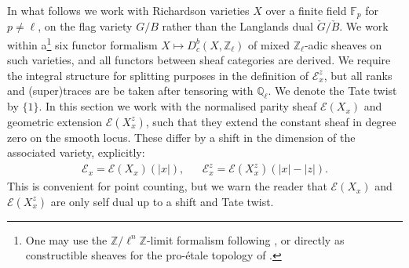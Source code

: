 \documentclass[11pt]{article}
\theoremstyle{remark}
\theoremstyle{definition}
\begin{document}
In what follows we work with Richardson varieties $X$ over a finite field $\mathbb{F}_p$ for $p\neq \ell$, on the flag variety $G/B$ rather than the Langlands dual $\check{G}/\check{B}$. We work within a\footnote{One may use the $\mathbb{Z}/\ell^n\mathbb{Z}$-limit formalism following \cite{E07}, or directly as constructible sheaves for the pro-\'{e}tale topology of \cite{BS13}.} six functor formalism $X\mapsto D^b_c(X,\mathbb{Z}_\ell)$ of mixed $\mathbb{Z}_\ell$-adic sheaves on such varieties, and all functors between sheaf categories are derived. We require the integral structure for splitting purposes in the definition of $\mathscr{E}^z_x$, but all ranks and (super)traces are be taken after tensoring with $\mathbb{Q}_\ell$. We denote the Tate twist by $\{1\}$. In this section we work with the normalised parity sheaf $\mathscr{E}(X_x)$ and geometric extension $\mathscr{E}(X_x^z)$, such that they extend the constant sheaf in degree zero on the smooth locus. These differ by a shift in the dimension of the associated variety, explicitly: \begin{align*}
    \mathscr{E}_x=\mathscr{E}(X_x)(|x|), &&
     \mathscr{E}^z_x =\mathscr{E}(X^z_x)(|x|-|z|).
\end{align*} This is convenient for point counting, but we warn the reader that $\mathscr{E}(X_x)$ and $\mathscr{E}(X^z_x)$ are only self dual up to a shift and Tate twist.
\end{document}
